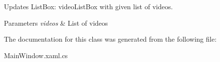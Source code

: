 Updates List\+Box\+: {\ttfamily video\+List\+Box} with given list of videos. 


\begin{DoxyParams}{Parameters}
{\em videos} & List of videos\\
\hline
\end{DoxyParams}


The documentation for this class was generated from the following file\+:\begin{DoxyCompactItemize}
\item 
Main\+Window.\+xaml.\+cs\end{DoxyCompactItemize}
